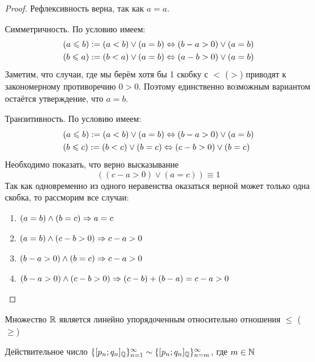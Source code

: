\begin{proof}
    Рефлексивность верна, так как $a = a$.
    
    Симметричность. По условию имеем:
    \begin{align*}
        &(a \leqslant b) := (a < b) \vee (a = b) \Leftrightarrow (b - a > 0) \vee (a = b) \\
        &(b \leqslant a) := (b < a) \vee (a = b) \Leftrightarrow (a - b > 0) \vee (a = b)
    \end{align*}
    Заметим, что случаи, где мы берём хотя бы 1 скобку с $<$ ($>$) приводят к закономерному противоречию $0 > 0$. Поэтому единственно возможным вариантом остаётся утверждение, что $a = b$.
    
    Транзитивность. По условию имеем:
    \begin{align*}
        &(a \leqslant b) := (a < b) \vee (a = b) \Leftrightarrow (b - a > 0) \vee (a = b) \\
        &(b \leqslant c) := (b < c) \vee (b = c) \Leftrightarrow (c - b > 0) \vee (b = c)
    \end{align*}
    Необходимо показать, что верно высказывание
    $$
        ((c - a > 0) \vee (a = c)) \equiv 1
    $$
    Так как одновременно из одного неравенства оказаться верной может только одна скобка, то рассморим все случаи:
    \begin{enumerate}
        \item $(a = b) \wedge (b = c) \Rightarrow a = c$
        \item $(a = b) \wedge (c - b > 0) \Rightarrow c - a > 0$
        \item $(b - a > 0) \wedge (b = c) \Rightarrow c - a > 0$
        \item $(b - a > 0) \wedge (c - b > 0) \Rightarrow (c - b) + (b - a) = c - a > 0$
    \end{enumerate}
\end{proof}

\begin{proposition}
    Множество $\mathbb{R}$ является линейно упорядоченным относительно отношения $\le$ ($\ge$)
\end{proposition}

\begin{note}
    Действительное число $\{[p_n; q_n]_{\mathbb{Q}}\}_{n = 1}^\infty \sim \{[p_n; q_n]_{\mathbb{Q}}\}_{n = m}^\infty$, где $m \in \mathbb{N}$
\end{note}

